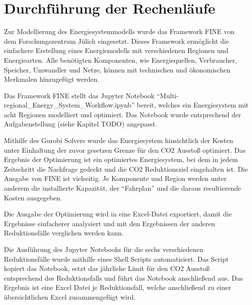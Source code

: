 \section{Durchführung der Rechenläufe}
Zur Modellierung des Energiesystemmodells wurde das Framework FINE von dem Forschungszentrum Jülich eingesetzt.
Dieses Framework ermöglicht die einfachere Erstellung eines Energiemodells mit verschiedenen Regionen und Energiearten. Alle benötigten Komponenten, wie Energiequellen, Verbraucher, Speicher, Umwandler und Netze, können mit technischen und ökonomischen Merkmalen hinzugefügt werden. 

Das Framework FINE stellt das Jupyter Notebook ``Multi-regional\_Energy\_System\_Workflow.ipynb'' bereit, welches ein Energiesystem mit acht Regionen modelliert und optimiert. Das Notebook wurde entsprechend der Aufgabenstellung (siehe Kapitel TODO) angepasst.

Mithilfe des Gurobi Solvers wurde das Energiesystem hinsichtlich der Kosten unter Einhaltung der zuvor gesetzen Grenze für den CO2 Ausstoß optimiert. Das Ergebnis der Optimierung ist ein optimiertes Energiesystem, bei dem in jedem Zeitschritt die Nachfrage gedeckt und die CO2 Reduktionsziel eingehalten ist. Die Ausgabe von FINE ist vielseitig. Je Komponente und Region werden unter anderem die installierte Kapazität, der ``Fahrplan'' und die daraus resultierende Kosten ausgegeben.

Die Ausgabe der Optimierung wird in eine Excel-Datei exportiert, damit die Ergebnisse einfacherer analysiert und mit den Ergebnissen der anderen Reduktionsfälle verglichen werden kann. 

Die Ausführung des Jupyter Notebooks für die sechs verschiedenen Reduktionsfälle wurde mithilfe eines Shell Scripts automatisiert. Das Script kopiert das Notebook, setzt das jährliche Limit für den CO2 Ausstoß entsprechend des Reduktionsfalls und führt das Notebook anschließend aus. Das Ergebnis ist eine Excel Datei je Reduktionsfall, welche anschließend zu einer übersichtlichen Excel zusammengefügt wird.